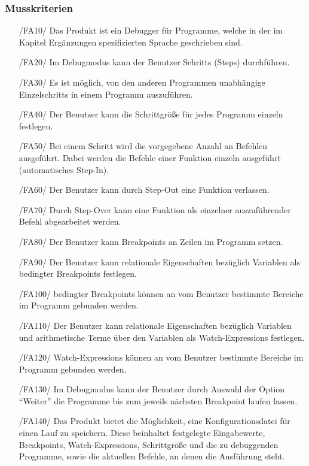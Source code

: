 \documentclass[parskip=full]{scrartcl}
\begin{document}
 		\subsubsection{Musskriterien}
		\begin{itemize}
		\item[/FA10/] Das Produkt ist ein \gls{Debugger} für Programme, welche in der im Kapitel Ergänzungen spezifizierten Sprache geschrieben sind.
		\item[/FA20/] Im \gls{Debugmodus} kann der Benutzer \glspl{Schritt} (Steps) durchführen.
		\item[/FA30/] Es ist möglich, von den anderen Programmen unabhängige \glspl{Einzelschritt} in einem Programm auszuführen.
		\item[/FA40/] Der Benutzer kann die Schrittgröße für jedes Programm einzeln festlegen.
		\item[/FA50/] Bei einem \gls{Schritt} wird die vorgegebene Anzahl an Befehlen ausgeführt. Dabei werden die Befehle einer Funktion einzeln ausgeführt (automatisches Step-In). 
		\item[/FA60/] Der Benutzer kann durch \gls{Step-Out} eine Funktion verlassen.
		\item[/FA70/] Durch \gls{Step-Over} kann eine Funktion als einzelner auszuführender Befehl abgearbeitet werden.
		\item[/FA80/] Der Benutzer kann \glspl{Breakpoint} an Zeilen im Programm setzen.
		\item[/FA90/] Der Benutzer kann relationale Eigenschaften bezüglich Variablen als \glspl{bedingter Breakpoint} festlegen.
		\item[/FA100/] \Glspl{bedingter Breakpoint} können an vom Benutzer bestimmte Bereiche im Programm gebunden werden.
		\item[/FA110/] Der Benutzer kann relationale Eigenschaften bezüglich Variablen und arithmetische Terme über den Variablen als \glspl{Watch-Expression} festlegen.
		\item[/FA120/] \glspl{Watch-Expression} können an vom Benutzer bestimmte Bereiche im Programm gebunden werden.
		\item[/FA130/] Im \gls{Debugmodus} kann der Benutzer durch Auswahl der Option \enquote{Weiter} die Programme bis zum jeweils nächsten Breakpoint laufen lassen.
		\item[/FA140/] Das Produkt bietet die Möglichkeit, eine \gls{Konfigurationsdatei} für einen Lauf zu speichern. Diese beinhaltet festgelegte Eingabewerte, \glspl{Breakpoint}, \glspl{Watch-Expression}, Schrittgröße und die zu debuggenden Programme, sowie die aktuellen Befehle, an denen die Ausführung steht.

\end{itemize}
\end{document}
